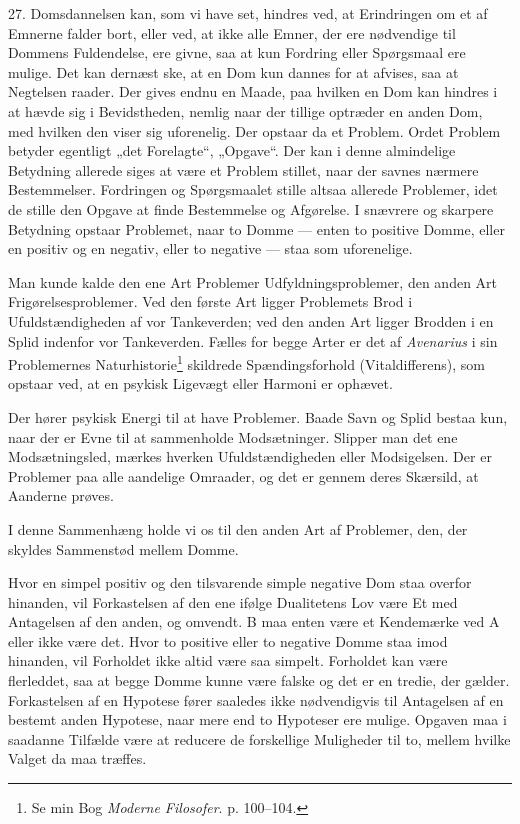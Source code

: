 \documentclass[12pt,a4paper]{book}
\newcommand{\opage}[1]{\marginnote{\footnotesize\textit{[#1]}}}
\begin{document}
27. Domsdannelsen kan, som vi have set, hindres ved, at Erindringen om
et af Emnerne falder bort, eller ved, at ikke alle Emner, der ere
nødvendige til Dommens Fuldendelse, ere givne, saa at kun Fordring eller
Spørgsmaal ere mulige. Det kan dernæst ske, at en Dom kun dannes for at
afvises, saa at Negtelsen raader. Der gives endnu en Maade, paa hvilken
en Dom kan hindres i at hævde sig i Bevidstheden, nemlig naar der
tillige optræder en anden Dom, med hvilken den viser sig uforenelig. Der
opstaar da et Problem. Ordet Problem betyder egentligt „det Forelagte“,
„Opgave“. Der kan i denne almindelige Betydning allerede siges at være
et Problem stillet, naar der savnes nærmere Bestemmelser. Fordringen og
Spørgsmaalet stille altsaa allerede Problemer, idet de stille den Opgave
at finde Bestemmelse og Afgørelse. I snævrere og skarpere Betydning
opstaar Problemet, naar to Domme --- enten to positive Domme, eller en
positiv og en negativ, eller to negative --- staa som uforenelige.

Man kunde kalde den ene Art Problemer Udfyldningsproblemer, den anden
Art Frigørelsesproblemer. Ved den \opage{79} første Art ligger Problemets Brod i
Ufuldstændigheden af vor Tankeverden; ved den anden Art ligger Brodden i
en Splid indenfor vor Tankeverden. Fælles for begge Arter er det af
\emph{Avenarius} i sin Problemernes Naturhistorie\footnote{Se min Bog
\emph{Moderne Filosofer}. p. 100--104.} skildrede Spændingsforhold
(Vitaldifferens), som opstaar ved, at en psykisk Ligevægt eller Harmoni
er ophævet.

Der hører psykisk Energi til at have Problemer. Baade Savn og Splid
bestaa kun, naar der er Evne til at sammenholde Modsætninger. Slipper man
det ene Modsætningsled, mærkes hverken Ufuldstændigheden eller
Modsigelsen. Der er Problemer paa alle aandelige Omraader, og det er
gennem deres Skærsild, at Aanderne prøves.

I denne Sammenhæng holde vi os til den anden Art af Problemer, den, der
skyldes Sammenstød mellem Domme.

Hvor en simpel positiv og den
tilsvarende simple negative Dom staa overfor hinanden, vil Forkastelsen
af den ene ifølge Dualitetens Lov være Et med Antagelsen af den anden,
og omvendt. B maa enten være et Kendemærke ved A eller ikke være det.
Hvor to positive eller to negative Domme staa imod hinanden, vil
Forholdet ikke altid være saa simpelt. Forholdet kan være flerleddet,
saa at begge Domme kunne være falske og det er en tredie, der gælder.
Forkastelsen af en Hypotese fører saaledes ikke nødvendigvis til
Antagelsen af en bestemt anden Hypotese, naar mere end to Hypoteser ere
mulige. Opgaven maa i saadanne Tilfælde være at reducere de forskellige
Muligheder til to, mellem hvilke Valget da maa træffes.
\end{document}
